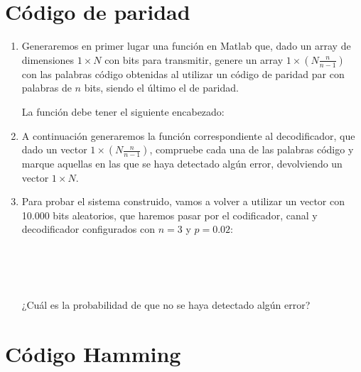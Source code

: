 \documentclass[es,practica]{uah}
\begin{document}
\section{Código de paridad}


	\begin{enumerate}
		\item \textrm{Generaremos en primer lugar una función en Matlab que, dado un array de dimensiones $1 \times N$ con bits para transmitir, genere un array $1 \times (N \frac{n}{n-1})$ con las palabras código obtenidas al utilizar un código de paridad par con palabras de $n$ bits, siendo el último el de paridad.}
	
			\textrm{La función debe tener el siguiente encabezado:}
			
	
		\item \textrm{A continuación generaremos la función correspondiente al decodificador, que dado un vector $1 \times (N \frac{n}{n-1})$, compruebe cada una de las palabras código y marque aquellas en las que se haya detectado algún error, devolviendo un vector $1 \times N$.}
		
				
		\item \textrm{Para probar el sistema construido, vamos a volver a utilizar un vector con 10.000 bits aleatorios, que haremos pasar por el codificador, canal y decodificador configurados con $n=3$ y $p=0.02$:}
		
			 \\
			\\
			\\
		
			\textrm{¿Cuál es la probabilidad de que no se haya detectado algún error?}
		
	\end{enumerate}


\section{Código Hamming}
\end{document}
